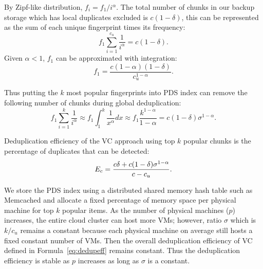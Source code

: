 By Zipf-like distribution, $f_i = {f_1}/{i^\alpha}.$
The total number of chunks in our backup storage which
has local duplicates excluded is $c (1-\delta)$, this can be represented
as the sum of each unique fingerprint times its frequency:
\[
f_1 \sum_{i=1}^{c_u}\frac{1}{i^\alpha} = c (1-\delta).
\]
Given $\alpha <1$, $f_1$ can be approximated with integration:
\[
f_1=\frac{c(1-\alpha)(1-\delta)}{c_u^{1-\alpha}}.
\]

Thus putting the $k$ most popular fingerprints into PDS index can remove the following number of chunks during global 
deduplication:
\[
f_1 \sum_{i=1}^{k}\frac{1}{i^\alpha} \approx  
f_1 \int_{1}^{k}\frac{1}{x^\alpha} dx  \approx  f_1\frac{  k^{1-\alpha}} {1-\alpha}
=c(1-\delta) \sigma^{1-\alpha}.
\]

Deduplication efficiency of the VC approach using top $k$ popular chunks
is the percentage of duplicates that can be detected:  
\begin{equation}
\label{eq:dedupeff}
E_c=\frac{ c\delta + c(1-\delta) \sigma^{1-\alpha}}
{c  - c_u }.\\
\end{equation}


We store the PDS index using a distributed shared memory hash table such as Memcached
and allocate a fixed percentage of memory space per physical machine for top $k$ popular items.
As the number of physical machines ($p$) increases,
the entire cloud cluster can host more VMs; however,  ratio $\sigma$ which is $k/c_u$ remains
a constant because each physical machine on average still hosts a fixed constant number of 
VMs. Then the overall deduplication efficiency of VC defined in Formula~\ref{eq:dedupeff}
remains constant.
Thus the deduplication efficiency is stable  as $p$ increases as long as $\sigma$  is a constant.


